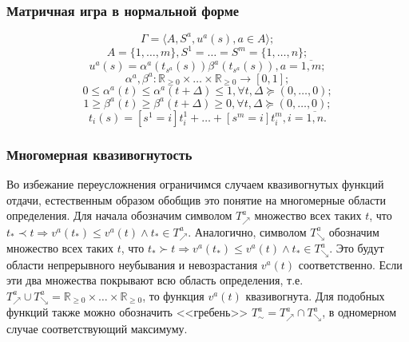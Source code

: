 \begin{frame}
	\frametitle{Матричная игра в нормальной форме}
	\begin{equation*}
		\Gamma = \langle A, S^a, u^a(s), a \in A \rangle;
	\end{equation*}
	\begin{equation*}
		A = \{1, \ldots, m\}, S^1 = \ldots = S^m = \{1, \ldots, n\};
	\end{equation*}
	\begin{equation*}
		u^a(s) = \alpha^a(t_{s^a}(s)) \beta^a(t_{s^a}(s)), a = \overline{1,m};
	\end{equation*}
	\begin{equation*}
		\alpha^a, \beta^a : \mathbb{R}_{\ge 0} \times \ldots \times \mathbb{R}_{\ge 0} \rightarrow [0, 1];
	\end{equation*}
	\begin{equation*}
		0 \le \alpha^a(t) \le \alpha^a(t + \Delta) \le 1, \forall t, \Delta \succeq (0, \ldots, 0);
	\end{equation*}
	\begin{equation*}
		1 \ge \beta^a(t) \ge \beta^a(t + \Delta) \ge 0, \forall t, \Delta \succeq (0, \ldots, 0);
	\end{equation*}
	\begin{equation*}
		t_i(s) = [s^1 = i] t_i^1 + \ldots + [s^m = i] t_i^m, i = \overline{1,n}.
	\end{equation*}
\end{frame}

\begin{frame}
	\frametitle{Многомерная квазивогнутость}
	Во избежание переусложнения ограничимся случаем квазивогнутых функций отдачи, естественным образом обобщив это понятие на многомерные области определения. Для начала обозначим символом $T^a_{\nearrow}$ множество всех таких $t$, что $t_* \prec t \Rightarrow v^a(t_*) \le v^a(t) \wedge t_* \in T^a_{\nearrow}$. Аналогично, символом $T^a_{\searrow}$ обозначим множество всех таких $t$, что $t_* \succ t \Rightarrow v^a(t_*) \le v^a(t) \wedge t_* \in T^a_{\searrow}$. Это будут области непрерывного неубывания и невозрастания $v^a(t)$ соответственно. Если эти два множества покрывают всю область определения, т.е. $T^a_{\nearrow} \cup T^a_{\searrow} = \mathbb{R}_{\ge 0} \times \ldots \times \mathbb{R}_{\ge 0}$, то функция $v^a(t)$ квазивогнута. Для подобных функций также можно обозначить <<гребень>> $T^a_{\sim} = T^a_{\nearrow} \cap T^a_{\searrow}$, в одномерном случае соответствующий максимуму.
\end{frame}

